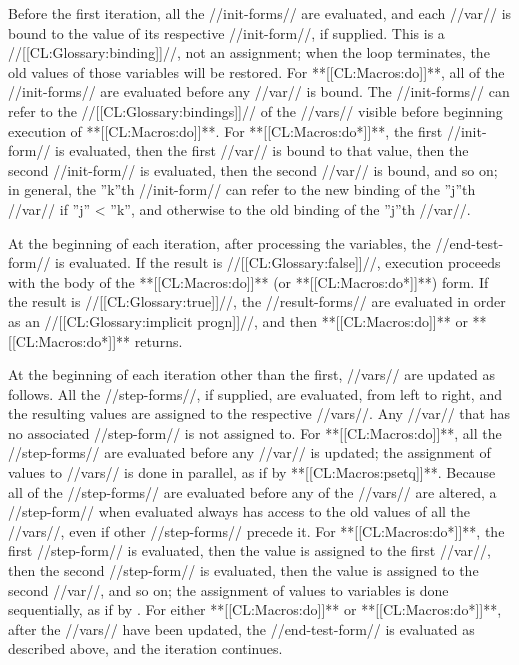 Before the first iteration, all the //init-forms// are evaluated, and each //var// is bound to the value of its respective //init-form//, if supplied. This is a //[[CL:Glossary:binding]]//, not an assignment; when the loop terminates, the old values of those variables will be restored. For **[[CL:Macros:do]]**, all of the //init-forms// are evaluated before any //var// is bound. The //init-forms// can refer to the //[[CL:Glossary:bindings]]// of the //vars// visible before beginning execution of **[[CL:Macros:do]]**. For **[[CL:Macros:do*]]**, the first //init-form// is evaluated, then the first //var// is bound to that value, then the second //init-form// is evaluated, then the second //var// is bound, and so on; in general, the ''k''th //init-form// can refer to the new binding of the ''j''th //var// if ''j'' < ''k'', and otherwise to the old binding of the ''j''th //var//.

At the beginning of each iteration, after processing the variables, the //end-test-form// is evaluated. If the result is //[[CL:Glossary:false]]//, execution proceeds with the body of the **[[CL:Macros:do]]** (or **[[CL:Macros:do*]]**) form. If the result is //[[CL:Glossary:true]]//, the //result-forms// are evaluated in order as an //[[CL:Glossary:implicit progn]]//, and then **[[CL:Macros:do]]** or **[[CL:Macros:do*]]** returns.

At the beginning of each iteration other than the first, //vars// are updated as follows. All the //step-forms//, if supplied, are evaluated, from left to right, and the resulting values are assigned to the respective //vars//. Any //var// that has no associated //step-form// is not assigned to. For **[[CL:Macros:do]]**, all the //step-forms// are evaluated before any //var// is updated; the assignment of values to //vars// is done in parallel, as if by **[[CL:Macros:psetq]]**. Because all of the //step-forms// are evaluated before any of the //vars// are altered, a //step-form// when evaluated always has access to the old values of all the //vars//, even if other //step-forms// precede it. For **[[CL:Macros:do*]]**, the first //step-form// is evaluated, then the value is assigned to the first //var//, then the second //step-form// is evaluated, then the value is assigned to the second //var//, and so on; the assignment of values to variables is done sequentially, as if by . For either **[[CL:Macros:do]]** or **[[CL:Macros:do*]]**, after the //vars// have been updated, the //end-test-form// is evaluated as described above, and the iteration continues.

